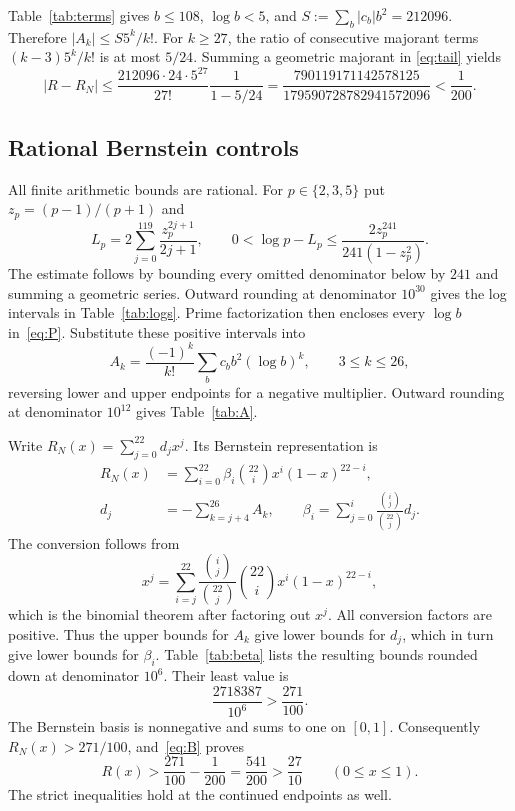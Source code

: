 \documentclass[11pt]{article}
\begin{document}
Table~\ref{tab:terms} gives $b\le108$, $\log b<5$, and
$S:=\sum_b|c_b|b^2=212096$. Therefore $|A_k|\le S5^k/k!$.
For $k\ge27$, the ratio of consecutive majorant terms
$(k-3)5^k/k!$ is at most $5/24$. Summing a geometric majorant in
\eqref{eq:tail} yields
\begin{equation}\label{eq:B}
 |R-R_N|\le
 \frac{212096\cdot24\cdot5^{27}}{27!}\frac1{1-5/24}
 =\frac{790119171142578125}{179590728782941572096}
 <\frac1{200}.
\end{equation}

\subsection{Rational Bernstein controls}

All finite arithmetic bounds are rational. For $p\in\{2,3,5\}$ put
$z_p=(p-1)/(p+1)$ and
\begin{equation}\label{eq:logs}
 L_p=2\sum_{j=0}^{119}\frac{z_p^{2j+1}}{2j+1},\qquad
 0<\log p-L_p\le
       \frac{2z_p^{241}}{241(1-z_p^2)}.
\end{equation}
The estimate follows by bounding every omitted denominator below by
$241$ and summing a geometric series. Outward rounding at denominator
$10^{30}$ gives the log intervals in Table~\ref{tab:logs}.
Prime factorization then encloses every $\log b$ in~\eqref{eq:P}.
Substitute these positive intervals into
\begin{equation}\label{eq:A}
 A_k=\frac{(-1)^k}{k!}\sum_b c_b b^2(\log b)^k,
 \qquad 3\le k\le26,
\end{equation}
reversing lower and upper endpoints for a negative multiplier.
Outward rounding at denominator $10^{12}$ gives
Table~\ref{tab:A}.

Write $R_N(x)=\sum_{j=0}^{22}d_jx^j$. Its Bernstein representation is
\begin{equation}\label{eq:bernstein}
 \begin{split}
 R_N(x)&=\sum_{i=0}^{22}\beta_i\binom{22}{i}x^i(1-x)^{22-i},\\
 d_j&=-\sum_{k=j+4}^{26}A_k,\qquad
 \beta_i=\sum_{j=0}^{i}\frac{\binom{i}{j}}{\binom{22}{j}}d_j.
 \end{split}
\end{equation}
The conversion follows from
\[
 x^j=\sum_{i=j}^{22}\frac{\binom{i}{j}}{\binom{22}{j}}
                         \binom{22}{i}x^i(1-x)^{22-i},
\]
which is the binomial theorem after factoring out $x^j$.
All conversion factors are positive. Thus the upper bounds for $A_k$
give lower bounds for $d_j$, which in turn give lower bounds for
$\beta_i$. Table~\ref{tab:beta} lists the resulting bounds rounded down
at denominator $10^6$. Their least value is
\[
 \frac{2718387}{10^6}>\frac{271}{100}.
\]
The Bernstein basis is nonnegative and sums to one on $[0,1]$.
Consequently $R_N(x)>271/100$, and~\eqref{eq:B} proves
\begin{equation}\label{eq:final-bound}
 R(x)>\frac{271}{100}-\frac1{200}
      =\frac{541}{200}>\frac{27}{10}
 \qquad(0\le x\le1).
\end{equation}
The strict inequalities hold at the continued endpoints as well.
\end{document}
